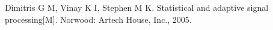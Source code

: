 \begin{thebibliography}{99}
  Dimitris G M, Vinay K I, Stephen M K. Statistical and adaptive signal processing[M]. Norwood: Artech House, Inc., 2005.
\end{thebibliography}